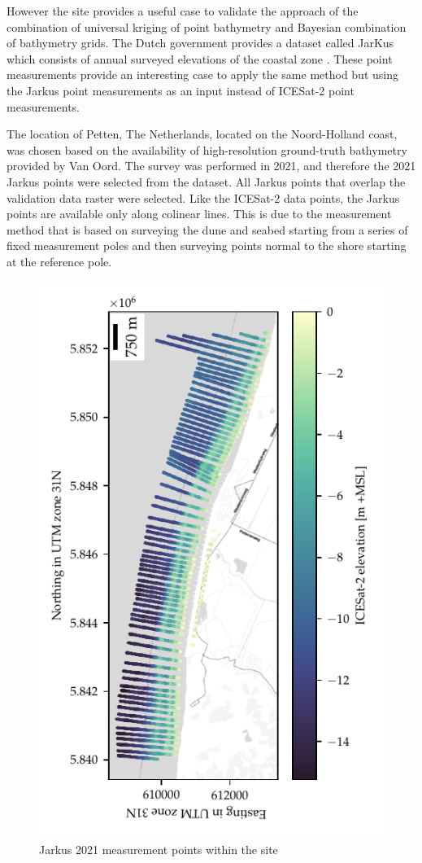 However the site provides a useful case to validate the approach of the combination of universal kriging of point bathymetry and Bayesian combination of bathymetry grids. The Dutch government provides a dataset called JarKus which consists of annual surveyed elevations of the coastal zone \parencite{Minneboo1995}. These point measurements provide an interesting case to apply the same method but using the Jarkus point measurements as an input instead of ICESat-2 point measurements.

The location of Petten, The Netherlands, located on the Noord-Holland coast, was chosen based on the availability of high-resolution ground-truth bathymetry provided by Van Oord. The survey was performed in 2021, and therefore the 2021 Jarkus points were selected from the dataset. All Jarkus points that overlap the validation data raster were selected. Like the ICESat-2 data points, the Jarkus points are available only along colinear lines. This is due to the measurement method that is based on surveying the dune and seabed starting from a series of fixed measurement poles and then surveying points normal to the shore starting at the reference pole.


\begin{figure}[h]
    \includegraphics[]{figures/Petten_photon_map.pdf}
    \caption{Jarkus 2021 measurement points within the site}
    \label{fig:jarkus-points}
\end{figure}


